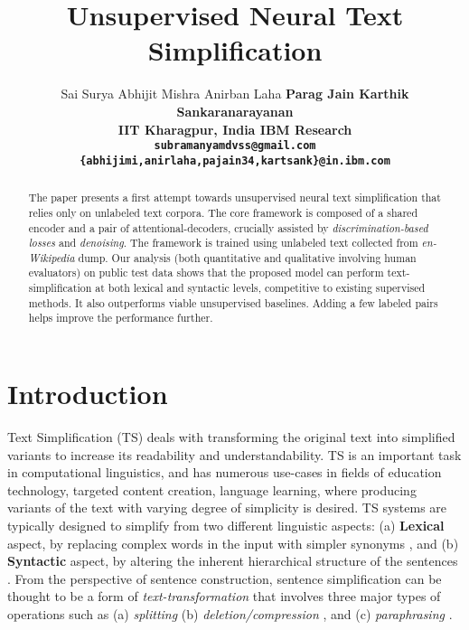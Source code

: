 \documentclass[11pt,a4paper]{article}
\title{Unsupervised Neural Text Simplification}
\author{Sai Surya \hspace{0.05cm} Abhijit Mishra \hspace{0.05cm} Anirban Laha \hspace{0.05cm} \bf{Parag Jain \hspace{0.05cm} Karthik Sankaranarayanan}\\
  IIT Kharagpur, India \hspace{0.1cm} 
  IBM Research\\
  {\tt subramanyamdvss@gmail.com} \\ {\tt \{abhijimi,anirlaha,pajain34,kartsank\}@in.ibm.com}
}
\date{}
\begin{document}
\maketitle
\begin{abstract}
The paper presents a first attempt towards unsupervised neural text simplification that relies only on unlabeled text corpora. The core framework is composed of a shared encoder and a pair of attentional-decoders, crucially assisted by \emph{discrimination-based losses} and \emph{denoising}. The framework is trained using unlabeled text collected from \textit{en-Wikipedia} dump. Our analysis (both quantitative and qualitative involving human evaluators) on public test data shows that the proposed model can perform text-simplification at both lexical and syntactic levels, competitive to existing supervised methods. It also outperforms viable unsupervised baselines. Adding a few labeled pairs helps improve the performance further. \end{abstract}

\section{Introduction}
\label{sec:intro}
Text Simplification (TS) deals with transforming the original text into simplified variants to increase its readability and understandability. TS is an important task in computational linguistics, and has numerous use-cases in fields of education technology, targeted content creation, language learning, where producing variants of the text with varying degree of simplicity is desired. TS systems are typically designed  to simplify from two different linguistic aspects: (a) \textbf{Lexical} aspect, by replacing complex words in the input with simpler synonyms \cite{devlin1998use,candido2009supporting,yatskar2010sake,biran2011putting,glavavs2015simplifying}, and  (b) \textbf{Syntactic} aspect, by altering the inherent hierarchical structure of the sentences \cite{chandrasekar1997automatic,canning1999syntactic,siddharthan2006syntactic,filippova2008dependency,brouwers2014syntactic}. From the perspective of sentence construction, sentence simplification can be thought to be a form of  \textit{text-transformation} that involves three major types of operations such as (a) \textit{splitting} \cite{siddharthan2006syntactic,petersen2007text,narayan2014hybrid} (b) \textit{deletion/compression} \cite{knight2002summarization,clarke2006models,filippova2008dependency,rush2015neural,filippova2015sentence}, and (c) \textit{paraphrasing}  \cite{specia2010translating,coster2011simple,wubben2012sentence,wang2016text,nisioi2017exploring}.
\end{document}
